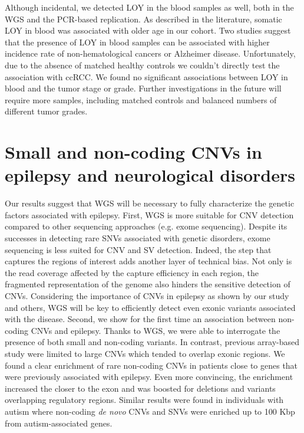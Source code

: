 Although incidental, we detected LOY in the blood samples as well, both in the WGS and the PCR-based replication.
As described in the literature, somatic LOY in blood was associated with older age in our cohort.
Two studies suggest that the presence of LOY in blood samples can be associated with higher incidence rate of non-hematological cancers or Alzheimer disease\cite{Forsberg2014,Dumanski2016}.
Unfortunately, due to the absence of matched healthy controls we couldn't directly test the association with ccRCC.
We found no significant associations between LOY in blood and the tumor stage or grade.
Further investigations in the future will require more samples, including matched controls and balanced numbers of different tumor grades.


\section*{Small and non-coding CNVs in epilepsy and neurological disorders}

Our results suggest that WGS will be necessary to fully characterize the genetic factors associated with epilepsy.
First, WGS is more suitable for CNV detection compared to other sequencing approaches (e.g. exome sequencing).
Despite its successes in detecting rare SNVs associated with genetic disorders, exome sequencing is less suited for CNV and SV detection.
Indeed, the step that captures the regions of interest adds another layer of technical bias.
Not only is the read coverage affected by the capture efficiency in each region, the fragmented representation of the genome also hinders the sensitive detection of CNVs.
Considering the importance of CNVs in epilepsy as shown by our study and others, WGS will be key to efficiently detect even exonic variants associated with the disease.
Second, we show for the first time an association between non-coding CNVs and epilepsy.
Thanks to WGS, we were able to interrogate the presence of both small and non-coding variants.
In contrast, previous array-based study were limited to large CNVs which tended to overlap exonic regions.
We found a clear enrichment of rare non-coding CNVs in patients close to genes that were previously associated with epilepsy.
Even more convincing, the enrichment increased the closer to the exon and was boosted for deletions and variants overlapping regulatory regions.
Similar results were found in individuals with autism where non-coding {\it de novo} CNVs and SNVs were enriched up to 100 Kbp from autism-associated genes\cite{Turner2016}.

